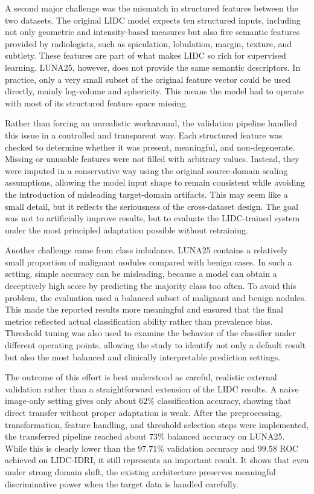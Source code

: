 \documentclass[10pt,letterpaper,twocolumn]{article}
\begin{document}
A second major challenge was the mismatch in structured features between the two datasets. The original LIDC model expects ten structured inputs, including not only geometric and intensity-based measures but also five semantic features provided by radiologists, such as spiculation, lobulation, margin, texture, and subtlety. These features are part of what makes LIDC so rich for supervised learning. LUNA25, however, does not provide the same semantic descriptors. In practice, only a very small subset of the original feature vector could be used directly, mainly log-volume and sphericity. This means the model had to operate with most of its structured feature space missing.

Rather than forcing an unrealistic workaround, the validation pipeline handled this issue in a controlled and transparent way. Each structured feature was checked to determine whether it was present, meaningful, and non-degenerate. Missing or unusable features were not filled with arbitrary values. Instead, they were imputed in a conservative way using the original source-domain scaling assumptions, allowing the model input shape to remain consistent while avoiding the introduction of misleading target-domain artifacts. This may seem like a small detail, but it reflects the seriousness of the cross-dataset design. The goal was not to artificially improve results, but to evaluate the LIDC-trained system under the most principled adaptation possible without retraining.

Another challenge came from class imbalance. LUNA25 contains a relatively small proportion of malignant nodules compared with benign cases. In such a setting, simple accuracy can be misleading, because a model can obtain a deceptively high score by predicting the majority class too often. To avoid this problem, the evaluation used a balanced subset of malignant and benign nodules. This made the reported results more meaningful and ensured that the final metrics reflected actual classification ability rather than prevalence bias. Threshold tuning was also used to examine the behavior of the classifier under different operating points, allowing the study to identify not only a default result but also the most balanced and clinically interpretable prediction settings.

The outcome of this effort is best understood as careful, realistic external validation rather than a straightforward extension of the LIDC results. A naive image-only setting gives only about $62\%$ classification accuracy, showing that direct transfer without proper adaptation is weak. After the preprocessing, transformation, feature handling, and threshold selection steps were implemented, the transferred pipeline reached about $73\%$ balanced accuracy on LUNA25. While this is clearly lower than the $97.71\%$ validation accuracy and $99.58$ ROC achieved on LIDC-IDRI, it still represents an important result. It shows that even under strong domain shift, the existing architecture preserves meaningful discriminative power when the target data is handled carefully.
\end{document}
